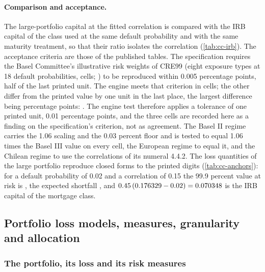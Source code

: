 \paragraph{Comparison and acceptance.} The large-portfolio capital at the fitted correlation is compared with the IRB capital of the
class used at the same default probability and with the same maturity treatment, so that their ratio isolates the correlation
(\cref{tab:cc-irb}). The acceptance criteria are those of the published tables. The specification requires the Basel Committee's illustrative
risk weights of CRE99 (eight exposure types at 18 default probabilities, \ccAnchorCells{} cells; \citealp{credit-capital:basel-cre99}) to be reproduced within 0.005
percentage points, half of the last printed unit. The engine meets that criterion in \ccAnchorHalfOk{} cells; the other \ccAnchorOff{} differ from the printed value by one
unit in the last place, the largest difference being \ccAnchorWorst{} percentage points: \ccAnchorOffList{}. The engine test therefore applies a tolerance of one printed unit, 0.01 percentage points, and
the three cells are recorded here as a finding on the specification's criterion, not as agreement. The Basel II regime
carries the 1.06 scaling and the 0.03 percent floor and is tested to equal 1.06 times the Basel III value on every cell, the European
regime to equal it, and the Chilean regime to use the correlations of its numeral 4.4.2. The loss quantities of the large portfolio
reproduce closed forms to the printed digits (\cref{tab:cc-anchors}): for a default probability of 0.02 and a correlation of 0.15 the
99.9 percent value at risk is \ccAnchorVar{}, the expected shortfall \ccAnchorEs{}, and $0.45\,(0.176329{}-0.02)=0.070348{}$ is the
IRB capital of the mortgage class.



\subsection{Portfolio loss models, measures, granularity and allocation}
\label{sec:m17}

\subsubsection{The portfolio, its loss and its risk measures}

